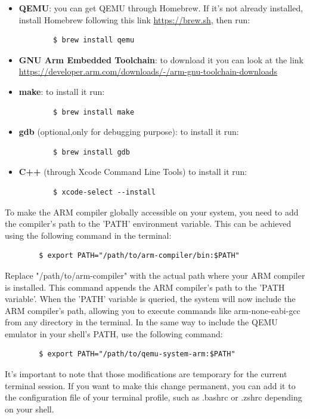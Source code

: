 \begin{itemize}

\item \textbf{QEMU}: you can get QEMU through Homebrew. If it's not already installed, install Homebrew following this link \url{https://brew.sh}, then run:
\begin{verbatim}
        $ brew install qemu
    \end{verbatim} 
\item\textbf{GNU Arm Embedded Toolchain}: to download it you can look at the link \\\url{https://developer.arm.com/downloads/-/arm-gnu-toolchain-downloads}
\end{itemize}
\begin{itemize}
\item\textbf{make}: to install it run: 
\begin{verbatim}
        $ brew install make
    \end{verbatim}
    
\item\textbf{gdb} (optional,only for debugging purpose): to install it run: 
\begin{verbatim}
        $ brew install gdb
    \end{verbatim}

\item\textbf{C++} (through Xcode Command Line Tools) to install it run:
\begin{verbatim}
        $ xcode-select --install
    \end{verbatim}
\end{itemize}   
To make the ARM compiler globally accessible on your system, you need to add the compiler's path to the 'PATH' environment variable. This can be achieved using the following command in the terminal:
\begin{verbatim}
        $ export PATH="/path/to/arm-compiler/bin:$PATH"
    \end{verbatim}
Replace "/path/to/arm-compiler" with the actual path where your ARM compiler is installed. This command appends the ARM compiler's path to the 'PATH variable'. When the 'PATH' variable is queried, the system will now include the ARM compiler's path, allowing you to execute commands like arm-none-eabi-gcc from any directory in the terminal.
In the same way to include the QEMU emulator in your shell's PATH, use the following command:
\begin{verbatim}
        $ export PATH="/path/to/qemu-system-arm:$PATH"
\end{verbatim}
It's important to note that those modifications are temporary for the current terminal session. If you want to make this change permanent, you can add it to the configuration file of your terminal profile, such as .bashrc or .zshrc depending on your shell.

